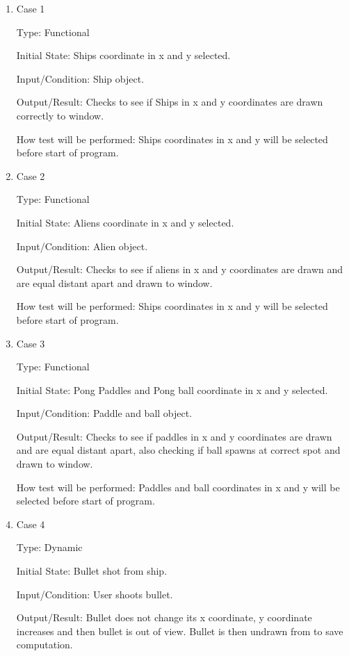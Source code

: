 \documentclass[12pt, titlepage]{article}
\begin{document}
\begin{enumerate}

\item{Case 1\\}

Type: Functional

Initial State: Ships coordinate in x and y selected.

Input/Condition: Ship object.

Output/Result: Checks to see if Ships in x and y coordinates are drawn correctly to window.

How test will be performed: Ships coordinates in x and y will be selected before start of program.

\item{Case 2\\}

Type: Functional

Initial State: Aliens coordinate in x and y selected.

Input/Condition: Alien object.

Output/Result: Checks to see if aliens in x and y coordinates are drawn and are equal distant apart and drawn to window.

How test will be performed: Ships coordinates in x and y will be selected before start of program.

\item{Case 3\\}

Type: Functional

Initial State: Pong Paddles and Pong ball coordinate in x and y selected.

Input/Condition: Paddle and ball object.

Output/Result: Checks to see if paddles in x and y coordinates are drawn and are equal distant apart, also checking if ball spawns at correct spot and drawn to window.

How test will be performed: Paddles and ball coordinates in x and y will be selected before start of program.

\item{Case 4\\}

Type: Dynamic

Initial State: Bullet shot from ship.

Input/Condition: User shoots bullet.

Output/Result: Bullet does not change its x coordinate, y coordinate increases and then bullet is out of view. Bullet is then undrawn from to save computation.


\end{enumerate}
\end{document}
